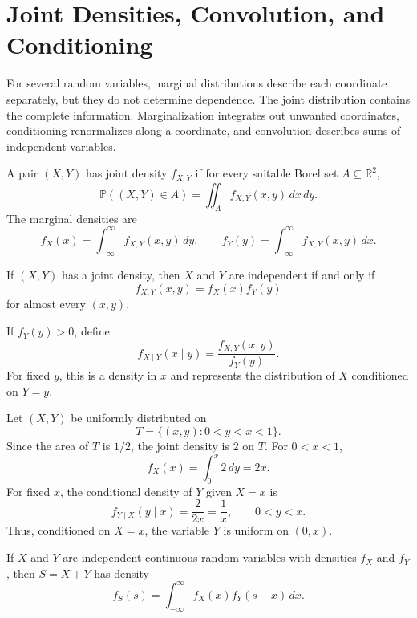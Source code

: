 \section{Joint Densities, Convolution, and Conditioning}

For several random variables, marginal distributions describe each coordinate separately, but they do not determine dependence. The joint distribution contains the complete information. Marginalization integrates out unwanted coordinates, conditioning renormalizes along a coordinate, and convolution describes sums of independent variables.

\begin{definition}
A pair $(X,Y)$ has joint density $f_{X,Y}$ if for every suitable Borel set $A\subseteq\mathbb{R}^2$,
\[
    \mathbb{P}((X,Y)\in A)
    =\iint_A f_{X,Y}(x,y)\,dx\,dy.
\]
The marginal densities are
\[
    f_X(x)=\int_{-\infty}^{\infty}f_{X,Y}(x,y)\,dy,
    \qquad
    f_Y(y)=\int_{-\infty}^{\infty}f_{X,Y}(x,y)\,dx.
\]
\end{definition}

\begin{theorem}
If $(X,Y)$ has a joint density, then $X$ and $Y$ are independent if and only if
\[
    f_{X,Y}(x,y)=f_X(x)f_Y(y)
\]
for almost every $(x,y)$.
\end{theorem}

\begin{definition}
If $f_Y(y)>0$, define
\[
    f_{X\mid Y}(x\mid y)
    =\frac{f_{X,Y}(x,y)}{f_Y(y)}.
\]
For fixed $y$, this is a density in $x$ and represents the distribution of $X$ conditioned on $Y=y$.
\end{definition}

\begin{example}
Let $(X,Y)$ be uniformly distributed on
\[
    T=\{(x,y):0<y<x<1\}.
\]
Since the area of $T$ is $1/2$, the joint density is $2$ on $T$. For $0<x<1$,
\[
    f_X(x)=\int_0^x2\,dy=2x.
\]
For fixed $x$, the conditional density of $Y$ given $X=x$ is
\[
    f_{Y\mid X}(y\mid x)=\frac{2}{2x}=\frac1x,
    \qquad0<y<x.
\]
Thus, conditioned on $X=x$, the variable $Y$ is uniform on $(0,x)$.
\end{example}

\begin{theorem}
If $X$ and $Y$ are independent continuous random variables with densities $f_X$ and $f_Y$, then $S=X+Y$ has density
\[
    f_S(s)=\int_{-\infty}^{\infty}f_X(x)f_Y(s-x)\,dx.
\]
\end{theorem}

